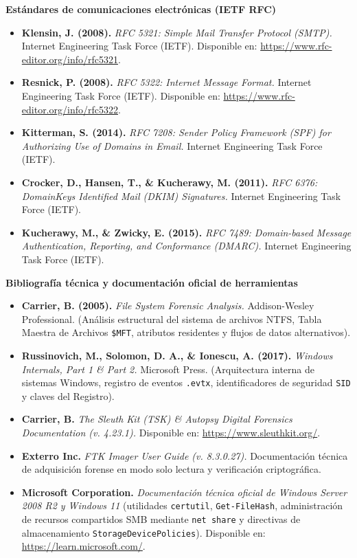 \textbf{Estándares de comunicaciones electrónicas (IETF RFC)}
\begin{itemize}[leftmargin=1.5em, itemsep=0.35em]
	\item \textbf{Klensin, J. (2008).} \textit{RFC 5321: Simple Mail Transfer Protocol (SMTP).} Internet Engineering Task Force (IETF). Disponible en: \url{https://www.rfc-editor.org/info/rfc5321}.
	\item \textbf{Resnick, P. (2008).} \textit{RFC 5322: Internet Message Format.} Internet Engineering Task Force (IETF). Disponible en: \url{https://www.rfc-editor.org/info/rfc5322}.
	\item \textbf{Kitterman, S. (2014).} \textit{RFC 7208: Sender Policy Framework (SPF) for Authorizing Use of Domains in Email.} Internet Engineering Task Force (IETF).
	\item \textbf{Crocker, D., Hansen, T., \& Kucherawy, M. (2011).} \textit{RFC 6376: DomainKeys Identified Mail (DKIM) Signatures.} Internet Engineering Task Force (IETF).
	\item \textbf{Kucherawy, M., \& Zwicky, E. (2015).} \textit{RFC 7489: Domain-based Message Authentication, Reporting, and Conformance (DMARC).} Internet Engineering Task Force (IETF).
\end{itemize}

\textbf{Bibliografía técnica y documentación oficial de herramientas}
\begin{itemize}[leftmargin=1.5em, itemsep=0.35em]
	\item \textbf{Carrier, B. (2005).} \textit{File System Forensic Analysis.} Addison-Wesley Professional. (Análisis estructural del sistema de archivos NTFS, Tabla Maestra de Archivos \texttt{\$MFT}, atributos residentes y flujos de datos alternativos).
	\item \textbf{Russinovich, M., Solomon, D. A., \& Ionescu, A. (2017).} \textit{Windows Internals, Part 1 \& Part 2.} Microsoft Press. (Arquitectura interna de sistemas Windows, registro de eventos \texttt{.evtx}, identificadores de seguridad \texttt{SID} y claves del Registro).
	\item \textbf{Carrier, B.} \textit{The Sleuth Kit (TSK) \& Autopsy Digital Forensics Documentation (v. 4.23.1).} Disponible en: \url{https://www.sleuthkit.org/}.
	\item \textbf{Exterro Inc.} \textit{FTK Imager User Guide (v. 8.3.0.27).} Documentación técnica de adquisición forense en modo solo lectura y verificación criptográfica.
	\item \textbf{Microsoft Corporation.} \textit{Documentación técnica oficial de Windows Server 2008 R2 y Windows 11} (utilidades \texttt{certutil}, \texttt{Get-FileHash}, administración de recursos compartidos SMB mediante \texttt{net share} y directivas de almacenamiento \texttt{StorageDevicePolicies}). Disponible en: \url{https://learn.microsoft.com/}.
\end{itemize}